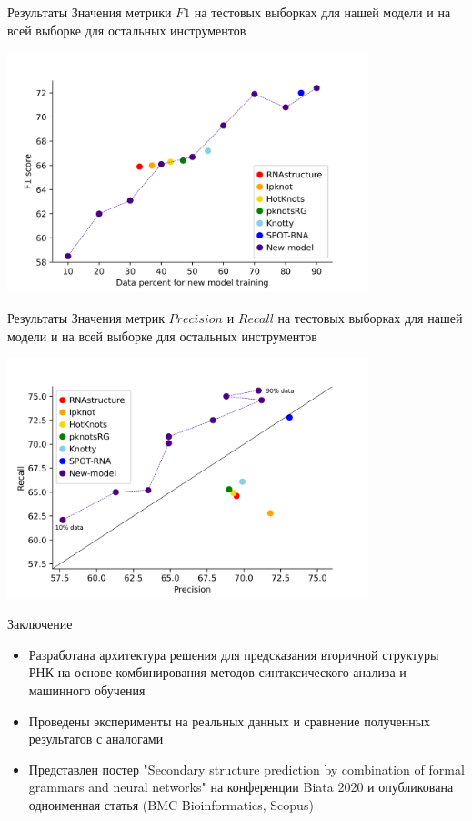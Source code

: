 \documentclass{beamer}
\begin{document}
\begin{frame}{Результаты}
Значения метрики $F1$ на тестовых выборках для нашей модели и на всей выборке для остальных инструментов

\centering
\includegraphics[width=10.5cm]{pics/plot_f1.png}
\end{frame}

\begin{frame}{Результаты}
Значения метрик $Precision$ и $Recall$ на тестовых выборках для нашей модели и на всей выборке для остальных инструментов

\centering
\includegraphics[width=10.5cm]{pics/plot_pr.png}
\end{frame}

\begin{frame}{Заключение}
\begin{itemize}
    \item Разработана архитектура решения для предсказания вторичной структуры РНК на основе комбинирования методов синтаксического анализа и машинного обучения
    \item Проведены эксперименты на реальных данных и сравнение полученных результатов с аналогами
    \item Представлен постер "Secondary structure prediction by combination of formal grammars and neural networks" на конференции Biata 2020 и опубликована одноименная статья (BMC Bioinformatics, Scopus)
\end{itemize}
\end{frame}
\end{document}
